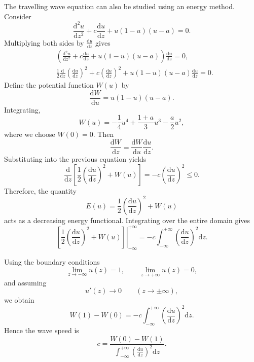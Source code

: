 The travelling wave equation can also be studied using an energy method. Consider
\begin{equation*}
\frac{\mathrm{d}^2u}{\mathrm{d}z^2}
+
c\frac{\mathrm{d}u}{\mathrm{d}z}
+
u(1-u)(u-a)
=
0.
\end{equation*}
Multiplying both sides by $\frac{\mathrm{d}u}{\mathrm{d}z}$ gives
\begin{align*}
&
\left(
\frac{\mathrm{d}^2u}{\mathrm{d}z^2}
+
c\frac{\mathrm{d}u}{\mathrm{d}z}
+
u(1-u)(u-a)
\right)
\frac{\mathrm{d}u}{\mathrm{d}z}
=0,
\\
&
\frac12
\frac{\mathrm{d}}{\mathrm{d}z}
\left(
\frac{\mathrm{d}u}{\mathrm{d}z}
\right)^2
+
c
\left(
\frac{\mathrm{d}u}{\mathrm{d}z}
\right)^2
+
u(1-u)(u-a)
\frac{\mathrm{d}u}{\mathrm{d}z}
=
0.
\end{align*}
Define the potential function $W(u)$ by
\begin{equation*}
\frac{\mathrm{d}W}{\mathrm{d}u}
=
u(1-u)(u-a).
\end{equation*}
Integrating,
\begin{equation*}
W(u)
=
-\frac14u^4
+
\frac{1+a}{3}u^3
-
\frac{a}{2}u^2,
\end{equation*}
where we choose $W(0)=0$.
Then
\begin{equation*}
\frac{\mathrm{d}W}{\mathrm{d}z}
=
\frac{\mathrm{d}W}{\mathrm{d}u}
\frac{\mathrm{d}u}{\mathrm{d}z}.
\end{equation*}
Substituting into the previous equation yields
\begin{equation*}
\frac{\mathrm{d}}{\mathrm{d}z}
\left[
\frac12
\left(
\frac{\mathrm{d}u}{\mathrm{d}z}
\right)^2
+
W(u)
\right]
=
-c
\left(
\frac{\mathrm{d}u}{\mathrm{d}z}
\right)^2
\le0.
\end{equation*}
Therefore, the quantity
\begin{equation*}
E(u)
=
\frac12
\left(
\frac{\mathrm{d}u}{\mathrm{d}z}
\right)^2
+
W(u)
\end{equation*}
acts as a decreasing energy functional.
Integrating over the entire domain gives
\begin{equation*}
\left.
\left[
\frac12
\left(
\frac{\mathrm{d}u}{\mathrm{d}z}
\right)^2
+
W(u)
\right]
\right|_{-\infty}^{+\infty}
=
-c
\int_{-\infty}^{+\infty}
\left(
\frac{\mathrm{d}u}{\mathrm{d}z}
\right)^2
\mathrm{d}z.
\end{equation*}

Using the boundary conditions
\begin{equation*}
\lim_{z\to-\infty}u(z)=1,
\qquad
\lim_{z\to+\infty}u(z)=0,
\end{equation*}
and assuming
\begin{equation*}
u'(z)\to0
\qquad
(z\to\pm\infty),
\end{equation*}
we obtain
\begin{equation*}
W(1)-W(0)
=
-c
\int_{-\infty}^{+\infty}
\left(
\frac{\mathrm{d}u}{\mathrm{d}z}
\right)^2
\mathrm{d}z.
\end{equation*}
Hence the wave speed is
\begin{equation*}
c
=
\frac{W(0)-W(1)}
{\displaystyle
\int_{-\infty}^{+\infty}
\left(
\frac{\mathrm{d}u}{\mathrm{d}z}
\right)^2
\mathrm{d}z }.
\end{equation*}

